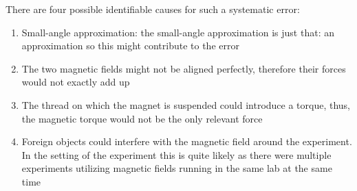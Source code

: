 \documentclass[14pt]{article}
\begin{document}
There are four possible identifiable causes for such a systematic error:

\begin{enumerate}
\item Small-angle approximation: the small-angle approximation is just that: an approximation so this might contribute to the error
\item The two magnetic fields might not be aligned perfectly, therefore their forces would not exactly add up
\item The thread on which the magnet is suspended could introduce a torque, thus, the magnetic torque would
      not be the only relevant force
\item Foreign objects could interfere with the magnetic field around the experiment. In the setting of the experiment
      this is quite likely as there were multiple experiments utilizing magnetic fields running in the same lab at the same time
\end{enumerate}

\printbibliography
\end{document}

